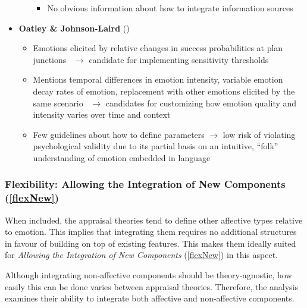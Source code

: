 \begin{itemize}
\begin{itemize}
\begin{itemize}
            \item No obvious information about how to integrate information
            sources
        \end{itemize}
    \end{itemize}

    \item \textbf{Oatley \& Johnson-Laird} (\good)
    \begin{itemize}
        \item Emotions elicited by relative changes in success probabilities at
        plan junctions~\citep[p.~98]{oatley1992best} $\rightarrow$ candidate
        for implementing sensitivity thresholds

        \item Mentions temporal differences in emotion intensity, variable
        emotion decay rates of emotion, replacement with other emotions
        elicited by the same scenario~\citep[p.~22--23]{oatley1992best}
        $\rightarrow$ candidates for customizing how emotion quality and
        intensity varies over time and context

        \item Few guidelines about how to define parameters $\rightarrow$ low
        risk of violating psychological validity due to its partial basis on an
        intuitive, ``folk'' understanding of emotion embedded in
        language~\citep[p.~74--75, 86--87]{oatley1992best}
    \end{itemize}
\end{itemize}

\subsubsection{Flexibility: Allowing the Integration of New Components
    (\ref{flexNew})}
When included, the appraisal theories tend to define other affective types
relative to emotion. This implies that integrating them requires no additional
structures in favour of building on top of existing features. This makes them
ideally suited for \textit{Allowing the Integration of New Components}
(\ref{flexNew}) in this aspect.

Although integrating non-affective components should be theory-agnostic, how
easily this can be done varies between appraisal theories. Therefore, the
analysis examines their ability to integrate both affective and non-affective
components.

